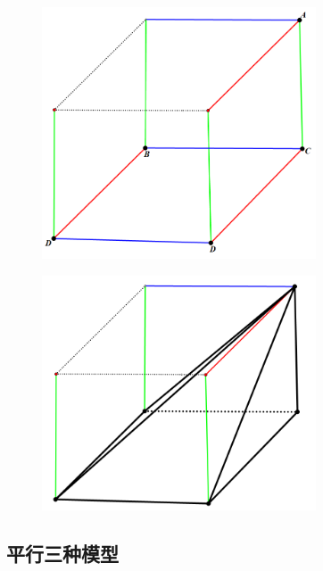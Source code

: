 \documentclass[hyperref, UTF8,11pt,a4paper]{ctexart} %
\begin{document}
\begin{figure}[!h] %
	\centering
	\begin{minipage}{230pt}
		\includegraphics[width=230pt]  {pic/litijihe/sanshituhuanyuan1.png} \\

	\end{minipage}
	\hspace{3pt}
	\begin{minipage}{230pt}
		\includegraphics[width=230pt]  {pic/litijihe/sanshituhuanyuan2.png} \\

	\end{minipage}
\end{figure}

\subsection{平行三种模型}
\end{document}
